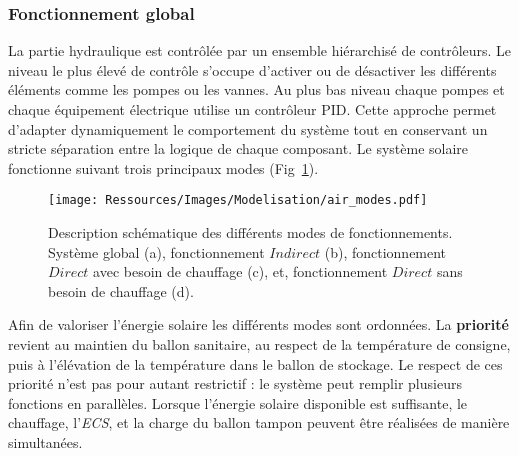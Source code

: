 \subsubsection{Fonctionnement global} %
\label{ssub:fonctionnement_global}
La partie hydraulique est contrôlée par un ensemble hiérarchisé de contrôleurs. Le niveau
le plus élevé de contrôle s’occupe d’activer ou de désactiver les différents éléments
comme les pompes ou les vannes. Au plus bas niveau chaque pompes et chaque équipement
électrique utilise un contrôleur PID. Cette approche permet d’adapter dynamiquement le
comportement du système tout en conservant un stricte séparation entre la logique de
chaque composant. Le système solaire fonctionne suivant trois principaux modes
(Fig~\ref{fig:schema_modes}).
\begin{figure}
    \begin{center}
        \texttt{[image: Ressources/Images/Modelisation/air\_modes.pdf]}
    \end{center}
    \caption{Description schématique des différents modes de fonctionnements. Système
    global (a), fonctionnement $Indirect$ (b), fonctionnement $Direct$ avec besoin de
    chauffage (c), et, fonctionnement $Direct$ sans besoin de chauffage (d).
             \label{fig:schema_modes}}
\end{figure}

Afin de valoriser l’énergie solaire les différents modes sont ordonnées. La \textbf{priorité} revient au maintien du ballon
sanitaire, au respect de la température de consigne, puis à l’élévation de la température
dans le ballon de stockage. Le respect de ces priorité n’est pas pour autant restrictif :
le système peut remplir plusieurs fonctions en parallèles. Lorsque l’énergie solaire
disponible est suffisante, le chauffage, l’\emph{ECS}, et la charge du ballon tampon
peuvent être réalisées de manière simultanées.

